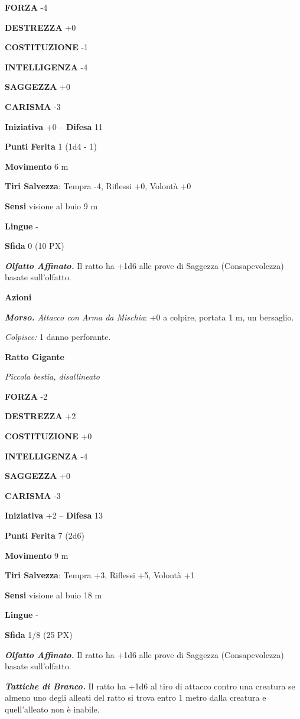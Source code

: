 \begin{multicols}{2}
\textbf{FORZA} -4

\textbf{DESTREZZA} +0

\textbf{COSTITUZIONE} -1

\textbf{INTELLIGENZA} -4

\textbf{SAGGEZZA} +0

\textbf{CARISMA} -3

\textbf{Iniziativa} +0 -- \textbf{Difesa} 11

\textbf{Punti Ferita} 1 (1d4 - 1)

\textbf{Movimento} 6 m

\textbf{Tiri Salvezza}: Tempra -4, Riflessi +0, Volontà +0

\textbf{Sensi} visione al buio 9 m

\textbf{Lingue} -

\textbf{Sfida} 0 (10 PX)

\textit{\textbf{Olfatto Affinato.}} Il ratto ha +1d6 alle prove di Saggezza (Consapevolezza) basate sull'olfatto.

\textbf{Azioni}

\textit{\textbf{Morso.} Attacco con Arma da Mischia}: +0 a colpire, portata 1 m, un bersaglio.

\textit{Colpisce:} 1 danno perforante.

\medskip\textbf{Ratto Gigante}

\textit{Piccola bestia, disallineato}

\textbf{FORZA} -2

\textbf{DESTREZZA} +2

\textbf{COSTITUZIONE} +0

\textbf{INTELLIGENZA} -4

\textbf{SAGGEZZA} +0

\textbf{CARISMA} -3

\textbf{Iniziativa} +2 -- \textbf{Difesa} 13

\textbf{Punti Ferita} 7 (2d6)

\textbf{Movimento} 9 m

\textbf{Tiri Salvezza}: Tempra +3, Riflessi +5, Volontà +1

\textbf{Sensi} visione al buio 18 m

\textbf{Lingue} -

\textbf{Sfida} 1/8 (25 PX)

\textit{\textbf{Olfatto Affinato.}} Il ratto ha +1d6 alle prove di Saggezza (Consapevolezza) basate sull'olfatto.

\textit{\textbf{Tattiche di Branco.}} Il ratto ha +1d6 al tiro di attacco contro una creatura se almeno uno degli alleati del ratto si trova entro 1 metro dalla creatura e quell'alleato non è inabile.


\end{multicols}
